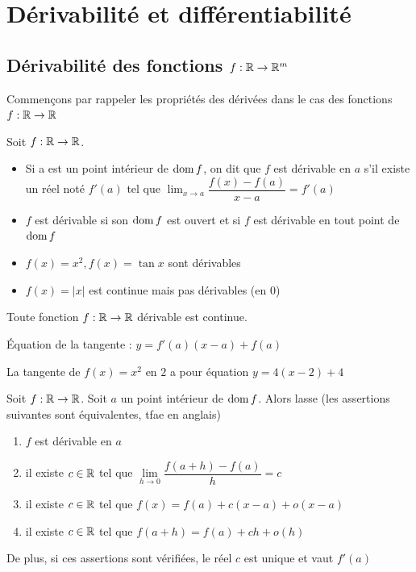 \chapter{Dérivabilité et différentiabilité}
     \section{Dérivabilité des fonctions $f:\mathbb{R}\to\mathbb{R}^m$}
     Commençons par rappeler les propriétés des dérivées dans le cas des fonctions $f:\mathbb{R}\to\mathbb{R}$
     \begin{definition}
         Soit $f:\mathbb{R}\to\mathbb{R}$.
         \begin{itemize}
             \item Si a est un point intérieur de $\operatorname{dom} f$, on dit que $f$ est dérivable en $a$ s'il existe un réel noté $f'(a)$ tel que $\lim_{x\to a}\dfrac{f(x)-f(a)}{x-a} = f'(a)$
             \item $f$ est dérivable si son $\operatorname{dom} f$ est ouvert et si $f$ est dérivable en tout point de $\operatorname{dom} f$
         \end{itemize}
     \end{definition}
     \begin{exemple}
         \begin{itemize}
             \item $f(x) = x^2, f(x) = \tan x$ sont dérivables
             \item $f(x) = |x|$ est continue mais pas dérivables (en $0$)
         \end{itemize}
         
     \end{exemple}
     \begin{proposition}
         Toute fonction $f:\mathbb{R}\to\mathbb{R}$ dérivable est continue.
     \end{proposition}
     Équation de la tangente : $y = f'(a)(x-a) + f(a)$
     \begin{exemple}
         La tangente de $f(x)= x^2$ en $2$ a pour équation $y =4(x-2)+4 $
     \end{exemple}
     \begin{proposition}
         Soit $f:\mathbb{R}\to\mathbb{R}$. Soit $a$ un point intérieur de $\operatorname{dom} f$. Alors lasse (les assertions suivantes sont équivalentes, tfae en anglais)
         \begin{enumerate}
             \item $f$ est dérivable en $a$
             \item il existe $c\in\mathbb{R}$ tel que $\lim\limits_{h\to0}\dfrac{f(a+h)-f(a)}{h} = c$
             \item il existe $c\in\mathbb{R}$ tel que $f(x) = f(a) + c(x-a) + o(x-a)$
             \item il existe $c\in\mathbb{R}$ tel que $f(a+h)=f(a) + c h + o(h)$
         \end{enumerate}
         De plus, si ces assertions sont vérifiées, le réel $c$ est unique et vaut $f'(a)$
     \end{proposition}
